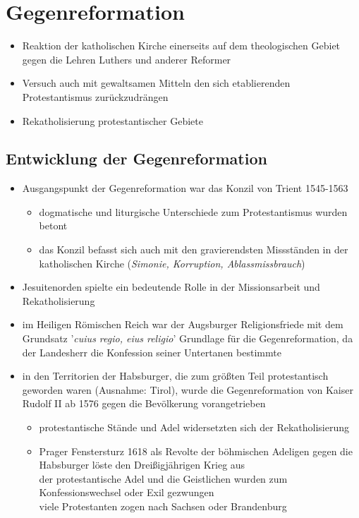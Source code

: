 \documentclass[11pt,a4paper]{article}
\begin{document}
\section*{\textsf{Gegenreformation}}

\begin{itemize}
\item Reaktion der katholischen Kirche einerseits auf dem theologischen Gebiet gegen die Lehren Luthers und anderer Reformer
\item Versuch auch mit gewaltsamen Mitteln den sich etablierenden Protestantismus zurückzudrängen
\item Rekatholisierung protestantischer Gebiete
\end{itemize}


\subsection*{\textsf{Entwicklung der Gegenreformation}}

\begin{itemize}
\item Ausgangspunkt der Gegenreformation war das Konzil von Trient 1545-1563

	\begin{itemize}
	\item dogmatische und liturgische Unterschiede zum Protestantismus wurden betont
	\item das Konzil befasst sich auch mit den gravierendsten Missständen in der katholischen Kirche (\textsl{Simonie, Korruption, Ablassmissbrauch})
	\end{itemize}

\item Jesuitenorden spielte ein bedeutende Rolle in der Missionsarbeit und Rekatholisierung
\item im Heiligen Römischen Reich war der Augsburger Religionsfriede mit dem Grundsatz '\textsl{cuius regio, eius religio}' Grundlage für die Gegenreformation, da der Landesherr die Konfession seiner Untertanen bestimmte
\item in den Territorien der Habsburger, die zum größten Teil protestantisch geworden waren (Ausnahme: Tirol), wurde die Gegenreformation von Kaiser Rudolf II ab 1576 gegen die Bevölkerung vorangetrieben

	\begin{itemize}
	\item protestantische Stände und Adel widersetzten sich der Rekatholisierung
	\item Prager Fenstersturz 1618 als Revolte der böhmischen Adeligen gegen die Habsburger löste den Dreißigjährigen Krieg aus\\
	 der protestantische Adel und die Geistlichen wurden zum Konfessionswechsel oder Exil gezwungen\\
	 viele Protestanten zogen nach Sachsen oder Brandenburg
	\end{itemize}

\end{itemize}
\end{document}
